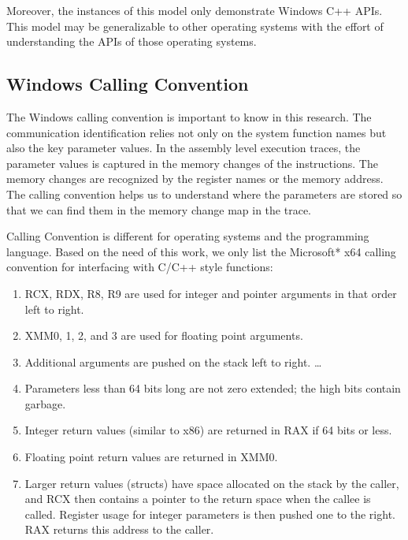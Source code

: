 Moreover, the instances of this model only demonstrate Windows C++ APIs. This model may be generalizable to other operating systems with the effort of understanding the APIs of those operating systems.

\subsection{Windows Calling Convention}
The Windows calling convention is important to know in this research. The communication identification relies not only on the system function names but also the key parameter values. In the assembly level execution traces, the parameter values is captured in the memory changes of the instructions. The memory changes are recognized by the register names or the memory address. The calling convention helps us to understand where the parameters are stored so that we can find them in the memory change map in the trace.

Calling Convention is different for operating systems and the programming language. Based on the need of this work, we only list the Microsoft* x64 calling convention for interfacing with C/C++ style functions:\par
\begin{enumerate}  
\item RCX, RDX, R8, R9 are used for integer and pointer arguments in that order left to right.
\item XMM0, 1, 2, and 3 are used for floating point arguments.
\item Additional arguments are pushed on the stack left to right. \ldots 
\item Parameters less than 64 bits long are not zero extended; the high bits contain garbage.
\item Integer return values (similar to x86) are returned in RAX if 64 bits or less.
\item Floating point return values are returned in XMM0.
\item Larger return values (structs) have space allocated on the stack by the caller, and RCX then contains a pointer to the return space when the callee is called. Register usage for integer parameters is then pushed one to the right. RAX returns this address to the caller.
\end{enumerate}

